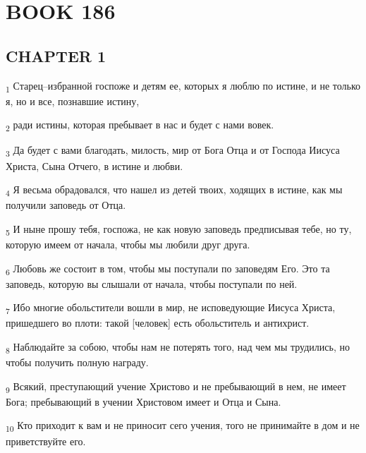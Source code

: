 \section{BOOK 186}
\subsection{CHAPTER 1}
\begin{tcolorbox}
\textsubscript{1} Старец--избранной госпоже и детям ее, которых я люблю по истине, и не только я, но и все, познавшие истину,
\end{tcolorbox}
\begin{tcolorbox}
\textsubscript{2} ради истины, которая пребывает в нас и будет с нами вовек.
\end{tcolorbox}
\begin{tcolorbox}
\textsubscript{3} Да будет с вами благодать, милость, мир от Бога Отца и от Господа Иисуса Христа, Сына Отчего, в истине и любви.
\end{tcolorbox}
\begin{tcolorbox}
\textsubscript{4} Я весьма обрадовался, что нашел из детей твоих, ходящих в истине, как мы получили заповедь от Отца.
\end{tcolorbox}
\begin{tcolorbox}
\textsubscript{5} И ныне прошу тебя, госпожа, не как новую заповедь предписывая тебе, но ту, которую имеем от начала, чтобы мы любили друг друга.
\end{tcolorbox}
\begin{tcolorbox}
\textsubscript{6} Любовь же состоит в том, чтобы мы поступали по заповедям Его. Это та заповедь, которую вы слышали от начала, чтобы поступали по ней.
\end{tcolorbox}
\begin{tcolorbox}
\textsubscript{7} Ибо многие обольстители вошли в мир, не исповедующие Иисуса Христа, пришедшего во плоти: такой [человек] есть обольститель и антихрист.
\end{tcolorbox}
\begin{tcolorbox}
\textsubscript{8} Наблюдайте за собою, чтобы нам не потерять того, над чем мы трудились, но чтобы получить полную награду.
\end{tcolorbox}
\begin{tcolorbox}
\textsubscript{9} Всякий, преступающий учение Христово и не пребывающий в нем, не имеет Бога; пребывающий в учении Христовом имеет и Отца и Сына.
\end{tcolorbox}
\begin{tcolorbox}
\textsubscript{10} Кто приходит к вам и не приносит сего учения, того не принимайте в дом и не приветствуйте его.
\end{tcolorbox}
